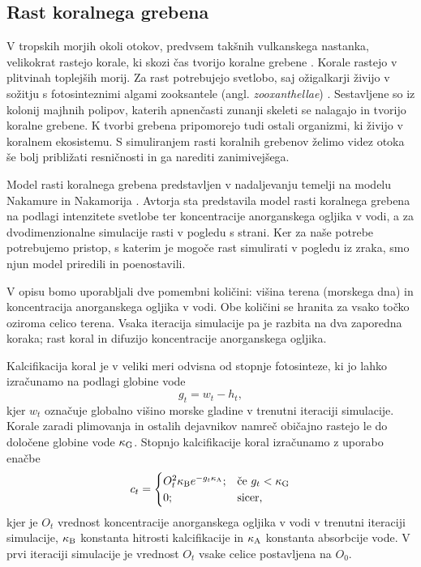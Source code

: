 \documentclass[9pt]{style/friteza}
\begin{document}
\subsection{Rast koralnega grebena}
V tropskih morjih okoli otokov, predvsem takšnih vulkanskega nastanka, velikokrat rastejo korale, ki skozi čas tvorijo koralne grebene \cite{oxford_encly_1995}. Korale rastejo v plitvinah toplejših morij. Za rast potrebujejo svetlobo, saj ožigalkarji živijo v sožitju s fotosinteznimi algami zooksantele (angl. \emph{zooxanthellae}) \cite{oxford_encly_1995}. Sestavljene so iz kolonij majhnih polipov, katerih apnenčasti zunanji skeleti se nalagajo in tvorijo koralne grebene. K tvorbi grebena pripomorejo tudi ostali organizmi, ki živijo v koralnem ekosistemu. S simuliranjem rasti koralnih grebenov želimo videz otoka še bolj približati resničnosti in ga narediti zanimivejšega.

Model rasti koralnega grebena predstavljen v nadaljevanju temelji na modelu Nakamure in Nakamorija \cite{nakamura_reef_simulation_11}. Avtorja sta predstavila model rasti koralnega grebena na podlagi intenzitete svetlobe ter koncentracije anorganskega ogljika v vodi, a za dvodimenzionalne simulacije rasti v pogledu s strani. Ker za naše potrebe potrebujemo pristop, s katerim je mogoče rast simulirati v pogledu iz zraka, smo njun model priredili in poenostavili.

V opisu bomo uporabljali dve pomembni količini: višina terena (morskega dna) in koncentracija anorganskega ogljika v vodi. Obe količini se hranita za vsako točko oziroma celico terena. Vsaka iteracija simulacije pa je razbita na dva zaporedna koraka; rast koral in difuzijo koncentracije anorganskega ogljika.

Kalcifikacija koral je v veliki meri odvisna od stopnje fotosinteze, ki jo lahko izračunamo na podlagi globine vode
\begin{equation} \label{eq:depth}
g_t = w_t - h_t,
\end{equation}
kjer $w_t$ označuje globalno višino morske gladine v trenutni iteraciji simulacije. Korale zaradi plimovanja in ostalih dejavnikov namreč običajno rastejo le do določene globine vode ${\kappa_\mathrm{G}}$. Stopnjo kalcifikacije koral izračunamo z uporabo enačbe
\begin{equation} \label{eq:calcification_rate}
c_t=
\begin{cases}
O_t^2 \kappa_\mathrm{B} e^{-g_t{\kappa_\mathrm{A}}}; & \text{če } g_t < {\kappa_\mathrm{G}} \\
0; & \text{sicer,} \\
\end{cases}
\end{equation}
kjer je $O_t$ vrednost koncentracije anorganskega ogljika v vodi v trenutni iteraciji simulacije, ${\kappa_\mathrm{B}}$ konstanta hitrosti kalcifikacije in ${\kappa_\mathrm{A}}$ konstanta absorbcije vode. V prvi iteraciji simulacije je vrednost $O_t$ vsake celice postavljena na $O_0$.
\end{document}
